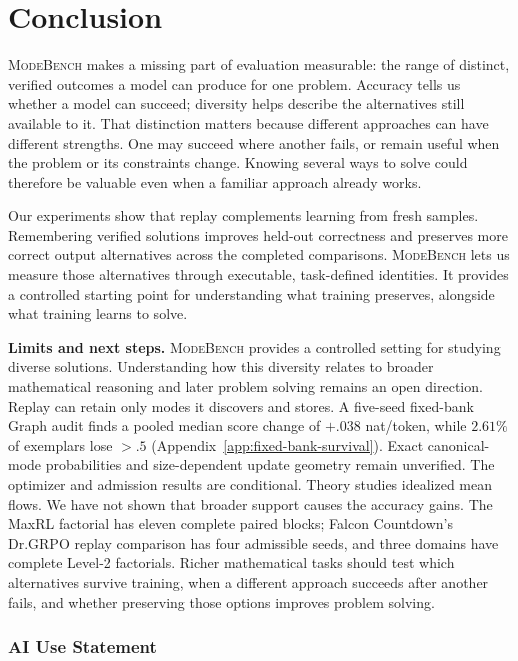 \documentclass{article}
\newcommand{\1}{\mathbf 1}
\newcommand{\mb}{\textsc{ModeBench}}
\theoremstyle{remark}
\theoremstyle{definition}
\theoremstyle{plain}
\begin{document}
\section{Conclusion}
\label{sec:conclusion}
\label{sec:discussion}
\label{sec:limitations}

\mb{} makes a missing part of evaluation measurable: the range of distinct,
verified outcomes a model can produce for one problem. Accuracy tells us whether
a model can succeed; diversity helps describe the alternatives still available
to it. That distinction matters because different approaches can have different
strengths. One may succeed where another fails, or remain useful when the
problem or its constraints change. Knowing several ways to solve could therefore
be valuable even when a familiar approach already works.

Our experiments show that replay complements learning from fresh samples.
Remembering verified solutions improves held-out correctness and preserves
more correct output alternatives across the completed comparisons. \mb{}
lets us measure those alternatives through executable, task-defined identities.
It provides a controlled starting point for understanding what training
preserves, alongside what training learns to solve.

\textbf{Limits and next steps.} \mb{} provides a controlled setting for
studying diverse solutions. Understanding how this diversity relates to broader
mathematical reasoning and later problem solving remains an open direction. Replay can
retain only modes it discovers and stores. A five-seed fixed-bank Graph audit
finds a pooled median score change of $+.038$ nat/token, while $2.61\%$ of
exemplars lose $>.5$ (Appendix~\ref{app:fixed-bank-survival}). Exact canonical-mode
probabilities and size-dependent update geometry remain unverified. The optimizer and admission results are conditional. Theory studies idealized mean flows.
We have not shown that broader support
causes the accuracy gains. The MaxRL factorial has eleven complete paired
blocks; Falcon Countdown's Dr.GRPO replay comparison has four admissible seeds,
and three domains have complete Level-2 factorials. Richer mathematical tasks
should test which alternatives survive training, when a different approach
succeeds after another fails, and whether preserving those options improves
problem solving.

\clearpage
\subsubsection*{AI Use Statement}
\label{sec:ai-use}
\end{document}
